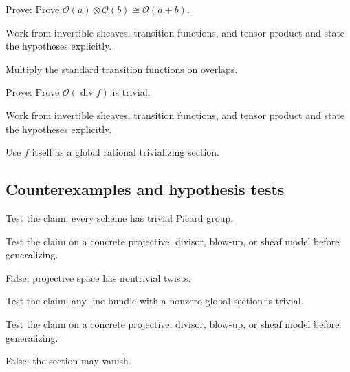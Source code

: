 \begin{exercise}\label{exr:vi42-expand-08}
Prove: Prove $\mathcal O(a)\otimes\mathcal O(b)\cong\mathcal O(a+b)$.
\end{exercise}
\begin{hint}
Work from invertible sheaves, transition functions, and tensor product and state the hypotheses explicitly.
\end{hint}
\begin{solution}
Multiply the standard transition functions on overlaps.
\end{solution}

\begin{exercise}\label{exr:vi42-expand-09}
Prove: Prove $\mathcal O(\operatorname{div}f)$ is trivial.
\end{exercise}
\begin{hint}
Work from invertible sheaves, transition functions, and tensor product and state the hypotheses explicitly.
\end{hint}
\begin{solution}
Use $f$ itself as a global rational trivializing section.
\end{solution}

\subsection*{Counterexamples and hypothesis tests}

\begin{exercise}\label{exr:vi42-expand-10}
Test the claim: every scheme has trivial Picard group.
\end{exercise}
\begin{hint}
Test the claim on a concrete projective, divisor, blow-up, or sheaf model before generalizing.
\end{hint}
\begin{solution}
False; projective space has nontrivial twists.
\end{solution}

\begin{exercise}\label{exr:vi42-expand-11}
Test the claim: any line bundle with a nonzero global section is trivial.
\end{exercise}
\begin{hint}
Test the claim on a concrete projective, divisor, blow-up, or sheaf model before generalizing.
\end{hint}
\begin{solution}
False; the section may vanish.
\end{solution}

